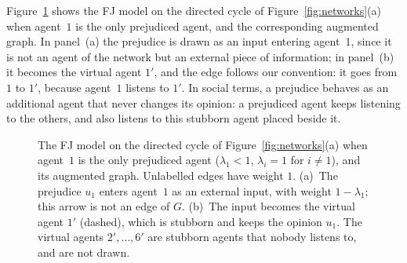 Figure~\ref{fig:augmented} shows the FJ model on the directed cycle of
Figure~\ref{fig:networks}(a) when agent~$1$ is the only prejudiced agent, and the
corresponding augmented graph. In panel~(a) the prejudice is drawn as an input
entering agent~$1$, since it is not an agent of the network but an external piece of
information; in panel~(b) it becomes the virtual agent $1'$, and the edge follows our
convention: it goes from $1$ to $1'$, because agent~$1$ listens to $1'$. In social
terms, a prejudice behaves as an additional agent that never changes its opinion: a
prejudiced agent keeps listening to the others, and also listens to this stubborn
agent placed beside it.

\begin{figure}[H]
  \centering
  \hspace{1.5cm}
  \caption{The FJ model on the directed cycle of Figure~\ref{fig:networks}(a) when
  agent~$1$ is the only prejudiced agent ($\lambda_1 < 1$, $\lambda_i = 1$ for
  $i \neq 1$), and its augmented graph. Unlabelled edges have weight $1$. (a)~The
  prejudice $u_1$ enters agent~$1$ as an external input, with weight $1-\lambda_1$;
  this arrow is not an edge of $G$. (b)~The input becomes the virtual agent $1'$
  (dashed), which is stubborn and keeps the opinion $u_1$. The virtual agents
  $2', \dots, 6'$ are stubborn agents that nobody listens to, and are not drawn.}
  \label{fig:augmented}
\end{figure}

